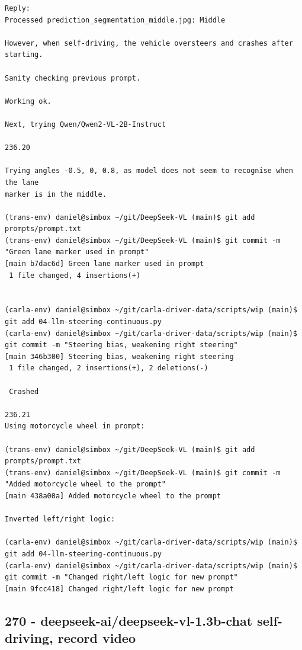 \begin{verbatim}
Reply:
Processed prediction_segmentation_middle.jpg: Middle

However, when self-driving, the vehicle oversteers and crashes after starting.

Sanity checking previous prompt.

Working ok.

Next, trying Qwen/Qwen2-VL-2B-Instruct

236.20

Trying angles -0.5, 0, 0.8, as model does not seem to recognise when the lane
marker is in the middle.

(trans-env) daniel@simbox ~/git/DeepSeek-VL (main)$ git add prompts/prompt.txt
(trans-env) daniel@simbox ~/git/DeepSeek-VL (main)$ git commit -m "Green lane marker used in prompt"
[main b7dac6d] Green lane marker used in prompt
 1 file changed, 4 insertions(+)


(carla-env) daniel@simbox ~/git/carla-driver-data/scripts/wip (main)$ git add 04-llm-steering-continuous.py 
(carla-env) daniel@simbox ~/git/carla-driver-data/scripts/wip (main)$ git commit -m "Steering bias, weakening right steering"
[main 346b300] Steering bias, weakening right steering
 1 file changed, 2 insertions(+), 2 deletions(-)

 Crashed

236.21
Using motorcycle wheel in prompt:

(trans-env) daniel@simbox ~/git/DeepSeek-VL (main)$ git add prompts/prompt.txt
(trans-env) daniel@simbox ~/git/DeepSeek-VL (main)$ git commit -m "Added motorcycle wheel to the prompt"
[main 438a00a] Added motorcycle wheel to the prompt

Inverted left/right logic:

(carla-env) daniel@simbox ~/git/carla-driver-data/scripts/wip (main)$ git add 04-llm-steering-continuous.py 
(carla-env) daniel@simbox ~/git/carla-driver-data/scripts/wip (main)$ git commit -m "Changed right/left logic for new prompt"
[main 9fcc418] Changed right/left logic for new prompt

\end{verbatim}

\subsection{270 - deepseek-ai/deepseek-vl-1.3b-chat self-driving, record video}
\label{app_res:270}

